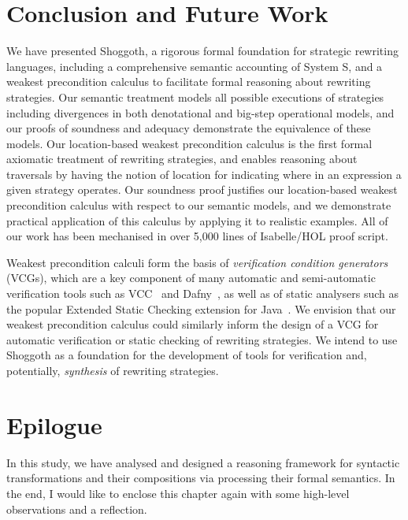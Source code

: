 \section{Conclusion and Future Work}
\label{chap4:conclusion-future-work}
We have presented Shoggoth, a rigorous formal foundation for strategic rewriting languages, including a comprehensive semantic accounting of System S, and a weakest precondition calculus to facilitate formal reasoning about rewriting strategies. Our semantic treatment models all possible executions of strategies including divergences in both denotational and big-step operational models, and our proofs of soundness and adequacy demonstrate the equivalence of these models. Our location-based weakest precondition calculus is the first formal axiomatic treatment of rewriting strategies, and enables reasoning about traversals by having the notion of location for indicating where in an expression a given strategy operates. Our soundness proof justifies our location-based weakest precondition calculus with respect to our semantic models, and we demonstrate practical application of this calculus by applying it to realistic examples. All of our work has been mechanised in over 5,000 lines of Isabelle/HOL proof script.

Weakest precondition calculi form the basis of \emph{verification condition generators} (VCGs), which are a key component of many automatic and semi-automatic verification tools such as VCC~\citep{DBLP:conf/tphol/CohenDHLMSST09} and Dafny~\citep{DBLP:conf/lpar/Leino10}, as well as of static analysers such as the popular Extended Static Checking extension for Java~\citep{DBLP:conf/pldi/FlanaganLLNSS02, DBLP:journals/ipl/Leino05}. We envision that our weakest precondition calculus could similarly inform the design of a VCG for automatic verification or static checking of rewriting strategies. We intend to use Shoggoth as a foundation for the development of tools for verification and, potentially, \emph{synthesis} of rewriting strategies.

\section{Epilogue}
\label{chap4:epilogue}
In this study, we have analysed and designed a reasoning framework for syntactic transformations and their compositions via processing their formal semantics. In the end, I would like to enclose this chapter again with some high-level observations and a reflection.

